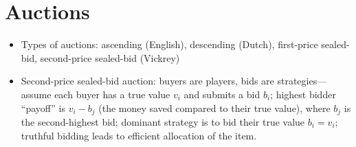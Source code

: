 \section{Auctions}

\begin{itemize}
    \item Types of auctions: ascending (English), descending (Dutch), first-price sealed-bid, second-price sealed-bid (Vickrey)
    \item Second-price sealed-bid auction: buyers are players, bids are strategies---assume each buyer has a true value $v_i$ and submits a bid $b_i$; highest bidder ``payoff'' is $v_i - b_j$ (the money saved compared to their true value), where $b_j$ is the second-highest bid; dominant strategy is to bid their true value $b_i = v_i$; truthful bidding leads to efficient allocation of the item.
\end{itemize}